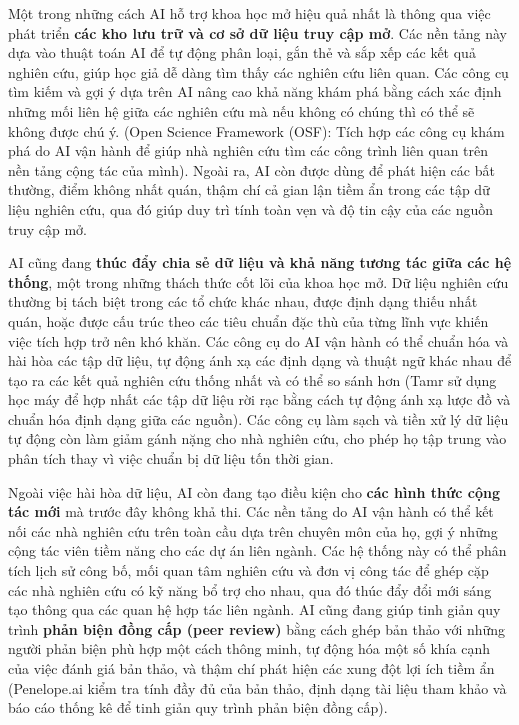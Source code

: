 Một trong những cách AI hỗ trợ khoa học mở hiệu quả nhất là thông qua việc phát triển \textbf{các kho lưu trữ và cơ sở dữ liệu truy cập mở}. Các nền tảng này dựa vào thuật toán AI để tự động phân loại, gắn thẻ và sắp xếp các kết quả nghiên cứu, giúp học giả dễ dàng tìm thấy các nghiên cứu liên quan. Các công cụ tìm kiếm và gợi ý dựa trên AI nâng cao khả năng khám phá bằng cách xác định những mối liên hệ giữa các nghiên cứu mà nếu không có chúng thì có thể sẽ không được chú ý. (Open Science Framework (OSF): Tích hợp các công cụ khám phá do AI vận hành để giúp nhà nghiên cứu tìm các công trình liên quan trên nền tảng cộng tác của mình). Ngoài ra, AI còn được dùng để phát hiện các bất thường, điểm không nhất quán, thậm chí cả gian lận tiềm ẩn trong các tập dữ liệu nghiên cứu, qua đó giúp duy trì tính toàn vẹn và độ tin cậy của các nguồn truy cập mở.

AI cũng đang \textbf{thúc đẩy chia sẻ dữ liệu và khả năng tương tác giữa các hệ thống}, một trong những thách thức cốt lõi của khoa học mở. Dữ liệu nghiên cứu thường bị tách biệt trong các tổ chức khác nhau, được định dạng thiếu nhất quán, hoặc được cấu trúc theo các tiêu chuẩn đặc thù của từng lĩnh vực khiến việc tích hợp trở nên khó khăn. Các công cụ do AI vận hành có thể chuẩn hóa và hài hòa các tập dữ liệu, tự động ánh xạ các định dạng và thuật ngữ khác nhau để tạo ra các kết quả nghiên cứu thống nhất và có thể so sánh hơn (Tamr sử dụng học máy để hợp nhất các tập dữ liệu rời rạc bằng cách tự động ánh xạ lược đồ và chuẩn hóa định dạng giữa các nguồn). Các công cụ làm sạch và tiền xử lý dữ liệu tự động còn làm giảm gánh nặng cho nhà nghiên cứu, cho phép họ tập trung vào phân tích thay vì việc chuẩn bị dữ liệu tốn thời gian.

Ngoài việc hài hòa dữ liệu, AI còn đang tạo điều kiện cho \textbf{các hình thức cộng tác mới} mà trước đây không khả thi. Các nền tảng do AI vận hành có thể kết nối các nhà nghiên cứu trên toàn cầu dựa trên chuyên môn của họ, gợi ý những cộng tác viên tiềm năng cho các dự án liên ngành. Các hệ thống này có thể phân tích lịch sử công bố, mối quan tâm nghiên cứu và đơn vị công tác để ghép cặp các nhà nghiên cứu có kỹ năng bổ trợ cho nhau, qua đó thúc đẩy đổi mới sáng tạo thông qua các quan hệ hợp tác liên ngành. AI cũng đang giúp tinh giản quy trình \textbf{phản biện đồng cấp (peer review)} bằng cách ghép bản thảo với những người phản biện phù hợp một cách thông minh, tự động hóa một số khía cạnh của việc đánh giá bản thảo, và thậm chí phát hiện các xung đột lợi ích tiềm ẩn (Penelope.ai kiểm tra tính đầy đủ của bản thảo, định dạng tài liệu tham khảo và báo cáo thống kê để tinh giản quy trình phản biện đồng cấp).

